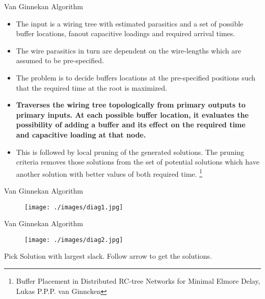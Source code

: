 \documentclass[10pt,sans,serif,trans]{beamer}
\begin{document}
\begin{frame}{Van Ginnekan Algorithm}
\begin{itemize}
   \item The input is a wiring tree with estimated parasitics and a set of possible
buffer locations, fanout capacitive loadings and required arrival times. 
\item The wire parasitics in turn are dependent on the wire-lengths which are
assumed to be pre-specified. 
\item The problem is to decide buffers locations at the pre-specified positions such that the
required time at the root is maximized. 
\item \textbf{Traverses the wiring tree topologically from primary outputs to primary inputs. At
each possible buffer location, it evaluates the possibility of adding a buffer and its
effect on the required time and capacitive loading at that node.}
\item This is followed by local pruning of the generated solutions. The pruning
criteria removes those solutions from the set of potential solutions
which have another solution with better values of both required time.
 \footnote{Buffer Placement in Distributed RC-tree Networks for Minimal Elmore Delay, Lukas P.P.P.
van Ginncken}  
 \end{itemize}
\end{frame}
\begin{frame}{Van Ginnekan Algorithm}
\begin{figure}[h]
   \centering
   \texttt{[image: ./images/diag1.jpg]}
\end{figure}
\end{frame}
\begin{frame}{Van Ginnekan Algorithm}
\begin{figure}[h]
   \centering
   \texttt{[image: ./images/diag2.jpg]}
\end{figure}
Pick Solution with largest slack. Follow arrow to get the solutions.
\end{frame}
\end{document}
